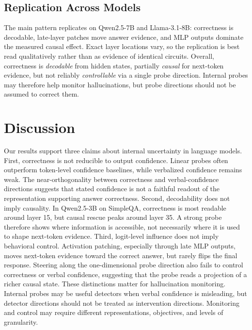 \documentclass{article}
\begin{document}
\subsection{Replication Across Models}

The main pattern replicates on Qwen2.5-7B and Llama-3.1-8B: correctness is decodable, late-layer patches move answer evidence, and MLP outputs dominate the measured causal effect. Exact layer locations vary, so the replication is best read qualitatively rather than as evidence of identical circuits. Overall, correctness is \emph{decodable} from hidden states, partially \emph{causal} for next-token evidence, but not reliably \emph{controllable} via a single probe direction. Internal probes may therefore help monitor hallucinations, but probe directions should not be assumed to correct them.

\section{Discussion}

Our results support three claims about internal uncertainty in language models. First, correctness is not reducible to output confidence. Linear probes often outperform token-level confidence baselines, while verbalized confidence remains weak. The near-orthogonality between correctness and verbal-confidence directions suggests that stated confidence is not a faithful readout of the representation supporting answer correctness. Second, decodability does not imply causality. In Qwen2.5-3B on SimpleQA, correctness is most readable around layer 15, but causal rescue peaks around layer 35. A strong probe therefore shows where information is accessible, not necessarily where it is used to shape next-token evidence. Third, logit-level influence does not imply behavioral control. Activation patching, especially through late MLP outputs, moves next-token evidence toward the correct answer, but rarely flips the final response. Steering along the one-dimensional probe direction also fails to control correctness or verbal confidence, suggesting that the probe reads a projection of a richer causal state. These distinctions matter for hallucination monitoring. Internal probes may be useful detectors when verbal confidence is misleading, but detector directions should not be treated as intervention directions. Monitoring and control may require different representations, objectives, and levels of granularity. 
\end{document}
